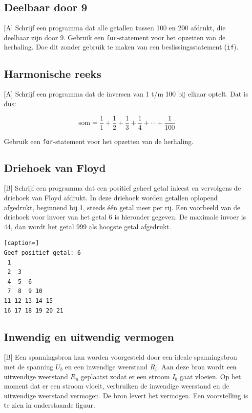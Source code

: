 \documentclass[a4paper,10pt,fleqn,twoside]{article}
\begin{document}
\subsection{Deelbaar door 9}[A]
Schrijf een programma dat alle getallen tussen 100 en 200 afdrukt, die deelbaar zijn door 9. Gebruik een \lstinline|for|-statement voor het opzetten van de herhaling. Doe dit zonder gebruik te maken van een beslissingsstatement (\lstinline|if|).

\subsection{Harmonische reeks}[A]
Schrijf een programma dat de inversen van 1 t/m 100 bij elkaar optelt. Dat is dus:

\begin{equation*}
\text{som} = \dfrac{1}{1}+\dfrac{1}{2}+\dfrac{1}{3}+\dfrac{1}{4} + \cdots + \dfrac{1}{100}
\end{equation*}

Gebruik een \lstinline|for|-statement voor het opzetten van de herhaling.
 
\subsection{Driehoek van Floyd}[B]
Schrijf een programma dat een positief geheel getal inleest en vervolgens de driehoek van Floyd afdrukt. In deze driehoek worden getallen oplopend afgedrukt, beginnend bij 1, steeds één getal meer per rij. Een voorbeeld van de driehoek voor invoer van het getal 6 is hieronder gegeven. De maximale invoer is 44, dan wordt het getal 999 als hoogste getal afgedrukt.

\begin{lstlisting}[caption=]
Geef positief getal: 6
 1
 2  3
 4  5  6
 7  8  9 10
11 12 13 14 15
16 17 18 19 20 21
\end{lstlisting}

\subsection{Inwendig en uitwendig vermogen}[B]
Een spanningsbron kan worden voorgesteld door een ideale spanningsbron met de spanning $U_b$ en een inwendige weerstand $R_i$. Aan deze bron wordt een uitwendige weerstand $R_u$ geplaatst zodat er een stroom $I_b$ gaat vloeien. Op het moment dat er een stroom vloeit, verbruiken de inwendige weerstand en de uitwendige weerstand vermogen. De bron levert het vermogen. Een voorstelling is te zien in onderstaande figuur.
\end{document}
